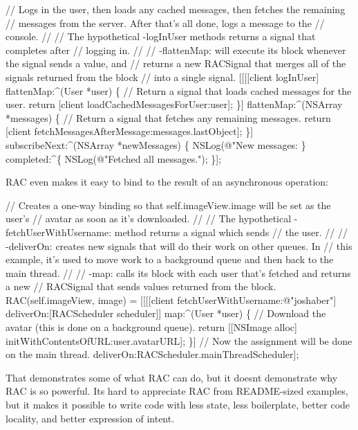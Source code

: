 \begin{DoxyCode}
// Logs in the user, then loads any cached messages, then fetches the remaining
// messages from the server. After that's all done, logs a message to the
// console.
//
// The hypothetical -logInUser methods returns a signal that completes after
// logging in.
//
// -flattenMap: will execute its block whenever the signal sends a value, and
// returns a new RACSignal that merges all of the signals returned from the block
// into a single signal.
[[[[client 
    logInUser] 
    flattenMap:^(User *user) \{
        // Return a signal that loads cached messages for the user.
        return [client loadCachedMessagesForUser:user];
    \}]
    flattenMap:^(NSArray *messages) \{
        // Return a signal that fetches any remaining messages.
        return [client fetchMessagesAfterMessage:messages.lastObject];
    \}]
    subscribeNext:^(NSArray *newMessages) \{
        NSLog(@"New messages: %
    \} completed:^\{
        NSLog(@"Fetched all messages.");
    \}];
\end{DoxyCode}


R\+AC even makes it easy to bind to the result of an asynchronous operation\+:


\begin{DoxyCode}
// Creates a one-way binding so that self.imageView.image will be set as the user's
// avatar as soon as it's downloaded.
//
// The hypothetical -fetchUserWithUsername: method returns a signal which sends
// the user.
//
// -deliverOn: creates new signals that will do their work on other queues. In
// this example, it's used to move work to a background queue and then back to the main thread.
//
// -map: calls its block with each user that's fetched and returns a new
// RACSignal that sends values returned from the block.
RAC(self.imageView, image) = [[[[client 
    fetchUserWithUsername:@"joshaber"]
    deliverOn:[RACScheduler scheduler]]
    map:^(User *user) \{
        // Download the avatar (this is done on a background queue).
        return [[NSImage alloc] initWithContentsOfURL:user.avatarURL];
    \}]
    // Now the assignment will be done on the main thread.
    deliverOn:RACScheduler.mainThreadScheduler];
\end{DoxyCode}


That demonstrates some of what R\+AC can do, but it doesn\textquotesingle{}t demonstrate why R\+AC is so powerful. It\textquotesingle{}s hard to appreciate R\+AC from R\+E\+A\+D\+M\+E-\/sized examples, but it makes it possible to write code with less state, less boilerplate, better code locality, and better expression of intent.

